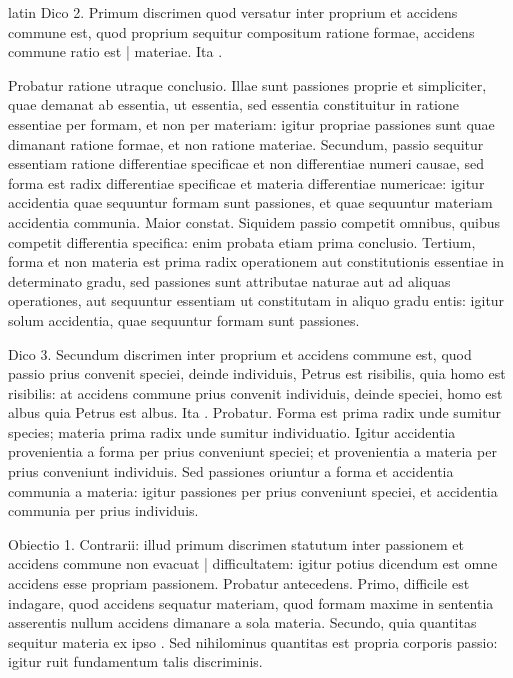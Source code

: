 \begin{otherlanguage*}{latin}
\pstart
Dico 2. Primum discrimen quod versatur inter proprium et accidens commune est, quod proprium sequitur compositum ratione formae, accidens commune ratio est \textnormal{|} materiae. Ita . 
\pend

\pstart
Probatur ratione utraque conclusio. Illae sunt passiones proprie et simpliciter, quae demanat ab essentia, ut essentia, sed essentia constituitur in ratione essentiae per formam, et non per materiam:
igitur propriae passiones sunt quae dimanant ratione formae, et non ratione materiae. Secundum, passio sequitur essentiam ratione differentiae specificae et non differentiae numeri causae, sed forma est radix differentiae specificae et materia differentiae numericae:
igitur accidentia quae sequuntur formam sunt passiones, et quae sequuntur materiam accidentia communia. Maior constat. Siquidem passio competit omnibus, quibus competit differentia specifica:
enim probata etiam prima conclusio. Tertium, forma et non materia est prima radix operationem aut constitutionis essentiae in determinato gradu, sed passiones sunt attributae naturae aut ad aliquas operationes, aut sequuntur essentiam ut constitutam in aliquo gradu entis:
igitur solum accidentia, quae sequuntur formam sunt passiones. 
\pend

\pstart
Dico 3. Secundum discrimen inter proprium et accidens commune est, quod passio prius convenit speciei, deinde individuis, Petrus est risibilis, quia homo est risibilis:
at accidens commune prius convenit individuis, deinde speciei, homo est albus quia Petrus est albus. Ita . Probatur. Forma est prima radix unde sumitur species; materia prima radix unde sumitur individuatio. Igitur accidentia provenientia a forma per prius conveniunt speciei; et provenientia a materia per prius conveniunt individuis. Sed passiones oriuntur a forma et accidentia communia a materia:
igitur passiones per prius conveniunt speciei, et accidentia communia per prius individuis. 
\pend

\pstart
Obiectio 1. Contrarii:
illud primum discrimen statutum inter passionem et accidens commune non evacuat \textnormal{|} difficultatem:
igitur potius dicendum est omne accidens esse propriam passionem. Probatur antecedens. Primo, difficile est indagare, quod accidens sequatur materiam, quod formam maxime in sententia  asserentis nullum accidens dimanare a sola materia. Secundo, quia quantitas sequitur materia ex ipso . Sed nihilominus quantitas est propria corporis passio:
igitur ruit fundamentum talis discriminis. 
\pend


\end{otherlanguage*}
